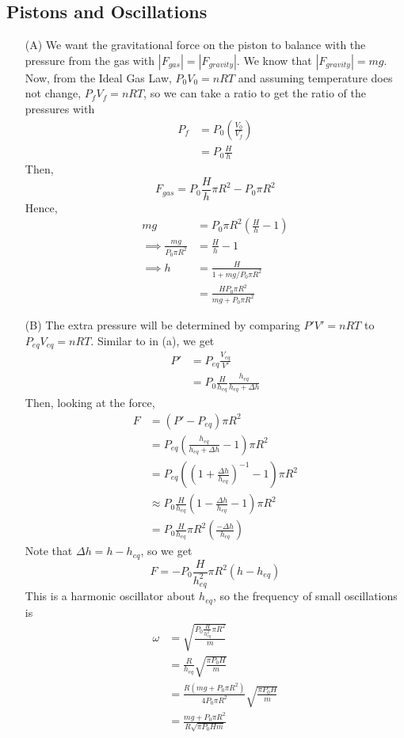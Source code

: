 \documentclass{article}
\begin{document}
\subsection{Pistons and Oscillations}

\begin{itemize}
	\item[(A)] We want the gravitational force on the piston to balance with the pressure from the gas with $|F_{gas}| = |F_{gravity}|$. We know that $|F_{gravity}| = mg$. Now, from the Ideal Gas Law, $P_0 V_0 = nRT$ and assuming temperature does not change, $P_f V_f = nRT$, so we can take a ratio to get the ratio of the pressures with
	\begin{align*}
	P_f &= P_0\left(\frac{V_0}{V_f}\right) \\
	&= P_0\frac{H}{h}
	\end{align*}
	Then,
	\begin{equation}
	F_{gas} = P_0\frac{H}{h}\pi R^2 - P_0\pi R^2
	\end{equation}
	Hence,
	\begin{align*}
	mg &= P_0 \pi R^2\left(\frac{H}{h} - 1\right) \\
	\implies \frac{mg}{P_0 \pi R^2} &= \frac{H}{h} - 1 \\
	\implies h &= \frac{H}{1+mg/P_0\pi R^2} \\
	&= \frac{HP_0\pi R^2}{mg + P_0\pi R^2}
	\end{align*}
	\item[(B)] The extra pressure will be determined by comparing $P'V' = nRT$ to $P_{eq}V_{eq} = nRT$. Similar to in (a), we get
	\begin{align*}
	P' &= P_{eq}\frac{V_{eq}}{V'} \\
	&= P_0\frac{H}{h_{eq}}\frac{h_{eq}}{h_{eq}+\Delta h}
	\end{align*}
	Then, looking at the force,
	\begin{align*}
	F &= (P' - P_{eq})\pi R^2 \\
	&= P_{eq}\left(\frac{h_{eq}}{h_{eq}+\Delta h} - 1\right)\pi R^2 \\
	&= P_{eq}\left(\left(1+\frac{\Delta h}{h_{eq}}\right)^{-1} - 1\right)\pi R^2 \\
	&\approx P_0\frac{H}{h_{eq}}\left(1-\frac{\Delta h}{h_{eq}} - 1\right)\pi R^2 \\
	&= P_0\frac{H}{h_{eq}}\pi R^2 \left(\frac{-\Delta h}{h_{eq}}\right)
	\end{align*}
	Note that $\Delta h = h - h_{eq}$, so we get
	\begin{equation}
	F = -P_0\frac{H}{h_{eq}^2} \pi R^2(h-h_{eq})
	\end{equation}
	This is a harmonic oscillator about $h_{eq}$, so the frequency of small oscillations is
	\begin{align*}
	\omega &= \sqrt{\frac{P_0\frac{H}{h_{eq}^2}\pi R^2}{m}} \\
	&= \frac{R}{h_{eq}}\sqrt{\frac{\pi P_0 H}{m}} \\
	&= \frac{R(mg + P_0 \pi R^2)}{4P_0 \pi R^2}\sqrt{\frac{\pi P_0 H}{m}} \\
	&= \frac{mg + P_0\pi R^2}{R\sqrt{\pi P_0 H m}}
	\end{align*}
\end{itemize}
\end{document}
